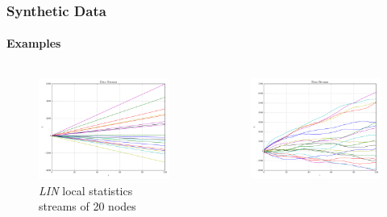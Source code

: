 \documentclass[hyperref={pdfpagelabels=false}]{beamer}
\begin{document}
\begin{frame}\frametitle{Synthetic Data}\framesubtitle{Examples}
\begin{columns}
\begin{column}[t]{0.32\linewidth}
\begin{figure}
\vspace{-1cm}
\centering
\includegraphics[scale=0.16]{../img/linear1D20N_streams.pdf}
\caption{\emph{LIN} local statistics streams of 20 nodes} 
\end{figure}
\end{column}
\begin{column}[t]{0.32\linewidth}
\begin{figure}
\vspace{-1cm}
\centering
\includegraphics[scale=0.16]{../img/interweaving1D20N_streams.pdf}

\end{figure}
\end{column}
\end{columns}
\end{frame}
\end{document}
